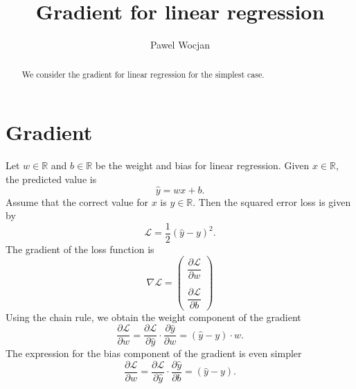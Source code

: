 \documentclass[12pt]{article}
\title{Gradient for linear regression}
\author{Pawel Wocjan}
\newcommand{\R}{\mathbb{R}}
\begin{document}
\maketitle


\begin{abstract}
We consider the gradient for linear regression for the simplest case.
\end{abstract}

\section{Gradient}

Let $w\in\R$ and $b\in\R$ be the weight and bias for linear regression.  Given $x\in\R$, the predicted value is
\begin{equation}
\hat{y} = w x + b.
\end{equation}
Assume that the correct value for $x$ is $y\in \R$.  Then the squared error loss is given by
\begin{equation}
\mathcal{L} = \frac{1}{2}(\hat{y}-y)^2.
\end{equation}
The gradient of the loss function is 
\begin{equation}
\nabla\mathcal{L} = \left(
\begin{array}{c}
\dfrac{\partial \mathcal{L}}{\partial w}  \\
\\
\dfrac{\partial \mathcal{L}}{\partial b} 
\end{array}
\right)
\end{equation}
Using the chain rule, we obtain the weight component of the gradient
\begin{equation}
\dfrac{\partial \mathcal{L}}{\partial w} =
\dfrac{\partial \mathcal{L}}{\partial\hat{y}} \cdot \dfrac{\partial \hat{y}}{\partial w} =
(\hat{y} - y) \cdot w.
\end{equation}
The expression for the bias component of the gradient is even simpler
\begin{equation}
\dfrac{\partial \mathcal{L}}{\partial w} =
\dfrac{\partial \mathcal{L}}{\partial\hat{y}} \cdot \dfrac{\partial \hat{y}}{\partial b} =
(\hat{y} - y).
\end{equation}
\end{document}
